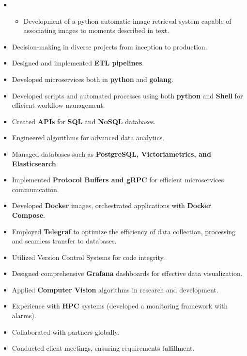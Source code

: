 \documentclass[10pt,a4paper,ragged2e,withhyper]{altacv}
\begin{document}
\begin{paracol}{2}



\begin{itemize}


\item[] 
  \begin{itemize}
    \item Development of a python automatic image retrieval system capable of associating images to moments described in text.


  \end{itemize}

\end{itemize}

  

  \begin{itemize}
    \item Decision-making in diverse projects from inception to production.
    \item Designed and implemented \textbf{ETL pipelines}.
    \item  Developed microservices both in \textbf{python} and \textbf{golang}.
    \item Developed scripts and automated processes using both  \textbf{python} and \textbf{Shell} for efficient workflow management.
    \item Created \textbf{APIs} for \textbf{SQL} and \textbf{NoSQL} databases.
    \item Engineered algorithms for advanced data analytics.
    \item Managed databases such as \textbf{PostgreSQL, Victoriametrics, and Elasticsearch}.
    \item Implemented \textbf{Protocol Buffers and gRPC} for efficient microservices communication.
    \item Developed \textbf{Docker} images, orchestrated applications with \textbf{Docker Compose}.
    \item Employed \textbf{Telegraf} to optimize the efficiency of data collection, processing and seamless transfer to databases.
    \item Utilized Version Control Systems for code integrity.
    \item Designed comprehensive \textbf{Grafana} dashboards for effective data visualization.
    \item Applied \textbf{Computer Vision} algorithms in research and development. 
    \item Experience with \textbf{HPC} systems (developed a monitoring framework with alarms).
    \item Collaborated with partners globally.
    \item Conducted client meetings, ensuring requirements fulfillment.


\end{itemize}
\end{paracol}
\end{document}
